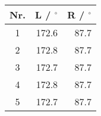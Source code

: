 \begin{tabular}{c|rr}
Nr. & L / ${}^\circ$ & R / ${}^\circ$ \\
\hline
1 & 172.6 & 87.7\\
2 & 172.8 & 87.7\\
3 & 172.7 & 87.7\\
4 & 172.8 & 87.7\\
5 & 172.7 & 87.7
\end{tabular}
